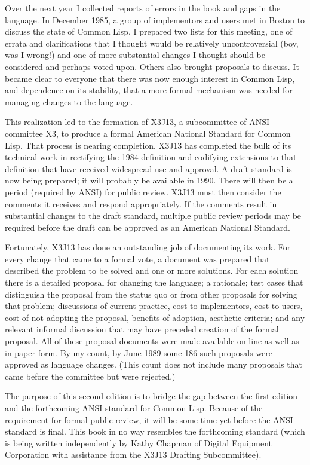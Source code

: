 Over the next year I collected reports of errors in the book and gaps in the
language.  In December 1985, a group of implementors and users met in
Boston to discuss the state of Common Lisp.  I prepared
two lists for this meeting, one of errata and clarifications
that I thought would be relatively uncontroversial (boy, was I wrong!)
and one of more substantial changes I thought should be considered and
perhaps voted upon.  Others also brought proposals to discuss.
It became clear to everyone that there was now enough interest in Common Lisp,
and dependence on its stability, that a more formal mechanism was needed for
managing changes to the language.

This realization led to the formation of X3J13, a subcommittee of
ANSI committee X3, to produce a formal American National Standard
for Common Lisp.  That process is nearing completion.  X3J13 has
completed the bulk of its technical work in rectifying the 1984
definition and codifying extensions to that definition that have
received widespread use and approval.  A draft standard is now
being prepared; it will probably be available
in 1990.  There will then be a period (required by ANSI) for
public review.  X3J13 must then consider the comments it receives
and respond appropriately.  If the comments result
in substantial changes to the draft standard, multiple public review
periods may be required before the draft can be approved as an American
National Standard.

Fortunately, X3J13 has done an outstanding job of documenting its work.
For every change that came to a formal vote, a document was prepared
that described the problem to be solved and one or more solutions.
For each solution there is a detailed proposal for changing the
language; a rationale; test cases that distinguish the proposal
from the status quo or from other proposals for solving that problem;
discussions of current practice, cost to implementors, cost to users,
cost of not adopting the proposal, benefits of adoption,
aesthetic criteria; and any relevant informal discussion that may have 
preceded creation of the formal proposal.  All of these proposal
documents were made available on-line as well as in paper form.
By my count, by June 1989 some
186 such proposals were approved as language changes.
(This count does not include many proposals that came before the committee
but were rejected.)

The purpose of this second edition is to bridge the gap between the
first edition and the forthcoming ANSI standard for Common Lisp.
Because of the requirement for formal public review,
it will be some time yet before the ANSI standard is final.
This book in no way resembles the forthcoming standard (which
is being written independently
by Kathy Chapman of Digital Equipment Corporation with assistance
from the X3J13 Drafting Subcommittee).

